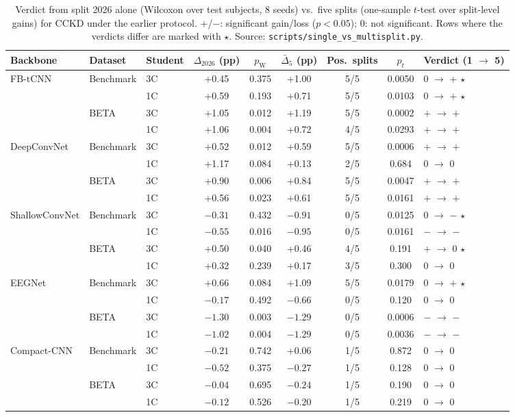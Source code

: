 \documentclass[10pt]{article} %
\begin{document}
\begin{table}[h]
\caption{Verdict from split 2026 alone (Wilcoxon over test subjects, 8 seeds) vs.\ five splits (one-sample $t$-test over split-level gains) for CCKD under the earlier protocol. $+$/$-$: significant gain/loss ($p<0.05$); 0: not significant. Rows where the verdicts differ are marked with $\star$. Source: \texttt{scripts/single\_vs\_multisplit.py}.}
\label{tab:single_vs_multi}
\begin{center}
\footnotesize
\begin{tabular}{lllcccccl}
\toprule
Backbone & Dataset & Student & $\Delta_{2026}$ (pp) & $p_{\text{W}}$ & $\bar\Delta_{5}$ (pp) & Pos.\ splits & $p_t$ & Verdict (1 $\to$ 5) \\
\midrule
FB-tCNN & Benchmark & 3C & +0.45 & 0.375 & +1.00 & 5/5 & 0.0050 & 0 $\to$ $+$ $\star$ \\
 & & 1C & +0.59 & 0.193 & +0.71 & 5/5 & 0.0103 & 0 $\to$ $+$ $\star$ \\
 & BETA & 3C & +1.05 & 0.012 & +1.19 & 5/5 & 0.0002 & $+$ $\to$ $+$ \\
 & & 1C & +1.06 & 0.004 & +0.72 & 4/5 & 0.0293 & $+$ $\to$ $+$ \\
DeepConvNet & Benchmark & 3C & +0.52 & 0.012 & +0.59 & 5/5 & 0.0006 & $+$ $\to$ $+$ \\
 & & 1C & +1.17 & 0.084 & +0.13 & 2/5 & 0.684 & 0 $\to$ 0 \\
 & BETA & 3C & +0.90 & 0.006 & +0.84 & 5/5 & 0.0047 & $+$ $\to$ $+$ \\
 & & 1C & +0.56 & 0.023 & +0.61 & 5/5 & 0.0161 & $+$ $\to$ $+$ \\
ShallowConvNet & Benchmark & 3C & $-0.31$ & 0.432 & $-0.91$ & 0/5 & 0.0125 & 0 $\to$ $-$ $\star$ \\
 & & 1C & $-0.55$ & 0.016 & $-0.95$ & 0/5 & 0.0161 & $-$ $\to$ $-$ \\
 & BETA & 3C & +0.50 & 0.040 & +0.46 & 4/5 & 0.191 & $+$ $\to$ 0 $\star$ \\
 & & 1C & +0.32 & 0.239 & +0.17 & 3/5 & 0.300 & 0 $\to$ 0 \\
EEGNet & Benchmark & 3C & +0.66 & 0.084 & +1.09 & 5/5 & 0.0179 & 0 $\to$ $+$ $\star$ \\
 & & 1C & $-0.17$ & 0.492 & $-0.66$ & 0/5 & 0.120 & 0 $\to$ 0 \\
 & BETA & 3C & $-1.30$ & 0.003 & $-1.29$ & 0/5 & 0.0006 & $-$ $\to$ $-$ \\
 & & 1C & $-1.02$ & 0.004 & $-1.29$ & 0/5 & 0.0036 & $-$ $\to$ $-$ \\
Compact-CNN & Benchmark & 3C & $-0.21$ & 0.742 & +0.06 & 1/5 & 0.872 & 0 $\to$ 0 \\
 & & 1C & $-0.52$ & 0.375 & $-0.27$ & 1/5 & 0.128 & 0 $\to$ 0 \\
 & BETA & 3C & $-0.04$ & 0.695 & $-0.24$ & 1/5 & 0.190 & 0 $\to$ 0 \\
 & & 1C & $-0.12$ & 0.526 & $-0.20$ & 1/5 & 0.219 & 0 $\to$ 0 \\
\bottomrule
\end{tabular}
\end{center}
\end{table}
\end{document}
